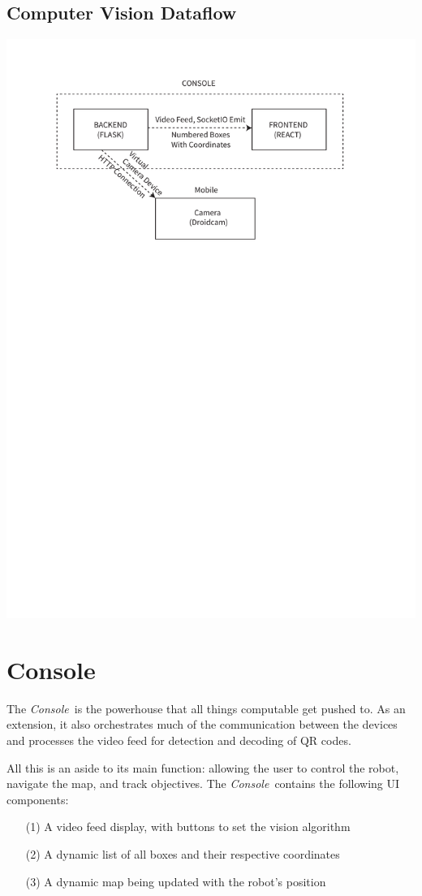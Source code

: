 \documentclass[a4paper,12pt]{article}
\newcommand{\con}{\textit{Console}}
\begin{document}
\subsection{Computer Vision Dataflow} \label{visflow}
\includegraphics[trim=40 550 0 57,scale=0.95,clip]{diagrams/vis.pdf}

\section{Console}

The \con\ is the powerhouse that all things computable get pushed to. As an extension, it also orchestrates much of the communication between the devices and processes the video feed for detection and decoding of QR codes.

All this is an aside to its main function: allowing the user to control the robot, navigate the map, and track objectives.
The \con\ contains the following UI components:
\begin{itemize}
    \item[(1)] A video feed display, with buttons to set the vision algorithm
    \item[(2)] A dynamic list of all boxes and their respective coordinates
    \item[(3)] A dynamic map being updated with the robot's position
\end{itemize}
\end{document}
